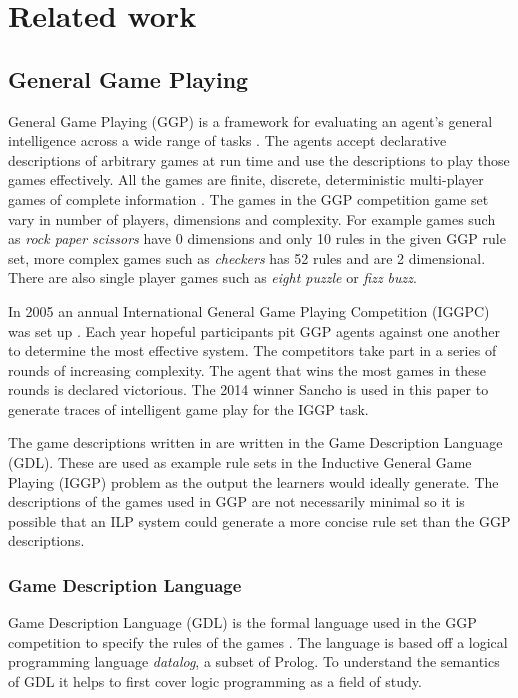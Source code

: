\chapter{Related work}

\section{General Game Playing}

General Game Playing (GGP) is a framework for evaluating an agent's general intelligence across a wide range of tasks \cite{Cropper/IGGP,Genesereth/GGPOverview}. The agents accept declarative descriptions of arbitrary games at run time and use the descriptions to play those games effectively. All the games are finite, discrete, deterministic multi-player games of complete information \cite{GDL_Spec}. The games in the GGP competition game set vary in number of players, dimensions and complexity. For example games such as \textit{rock paper scissors} have 0 dimensions and only 10 rules in the given GGP rule set, more complex games such as \textit{checkers} has 52 rules and are 2 dimensional. There are also single player games such as \textit{eight puzzle} or \textit{fizz buzz}.

In 2005 an annual International General Game Playing Competition (IGGPC) was set up \cite{Kowalski/GGP}. Each year hopeful participants pit GGP agents against one another to determine the most effective system. The competitors take part in a series of rounds of increasing complexity. The agent that wins the most games in these rounds is declared victorious. The 2014 winner Sancho is used in this paper to generate traces of intelligent game play for the IGGP task.

The game descriptions written in are written in the Game Description Language (GDL). These are used as example rule sets  in the Inductive General Game Playing (IGGP) problem as the output the learners would ideally generate. The descriptions of the games used in GGP are not necessarily minimal so it is possible that an ILP system could generate a more concise rule set than the GGP descriptions.

\subsection{Game Description Language}\label{sec:GDL}
Game Description Language (GDL) is the formal language used in the GGP competition to specify the rules of the games \cite{GDL_Spec}. The language is based off a logical programming language \textit{datalog}, a subset of Prolog. To understand the semantics of GDL it helps to first cover logic programming as a field of study.
